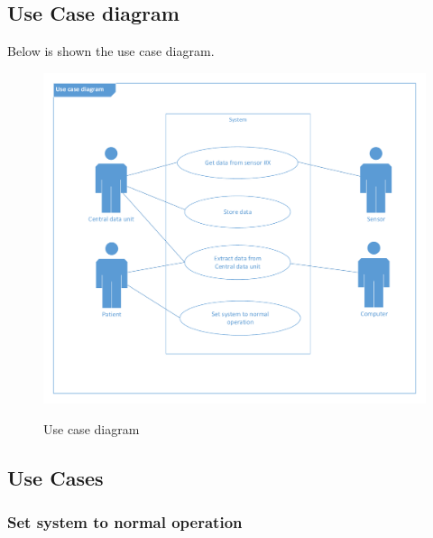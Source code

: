 \subsection{Use Case diagram}
Below is shown the use case diagram.
\begin{figure}[H]
\centering
\includegraphics*[width=.7\textwidth]{billeder/UseCase_vector}
\label{usecase_fig}
\caption{Use case diagram}
\end{figure}

\subsection{Use Cases}

\subsubsection{Set system to normal operation}

